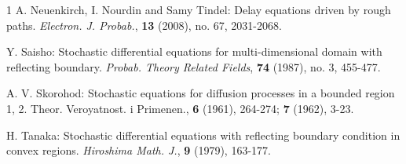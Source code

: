 \documentclass[11pt,reqno,oneside]{amsart}
\numberwithin{equation}{section}
\begin{document}
\begin{thebibliography}{1}
 A. Neuenkirch, I. Nourdin and Samy Tindel: Delay equations driven by rough paths. {\it Electron. J. Probab.}, {\bf 13} (2008), no. 67, 2031-2068.



 Y. Saisho: Stochastic differential equations for multi-dimensional domain with reflecting boundary. {\it Probab. Theory Related Fields}, {\bf 74} (1987), no. 3, 455-477.



 A. V. Skorohod:  Stochastic equations for diffusion processes in a bounded region 1, 2. {Theor. Veroyatnost. i Primenen.}, {\bf 6} (1961), 264-274; {\bf 7} (1962), 3-23.



 H. Tanaka: Stochastic differential equations with reflecting boundary condition in convex regions. {\it Hiroshima Math.  J.}, {\bf 9} (1979), 163-177.

\end{thebibliography}
\end{document}
